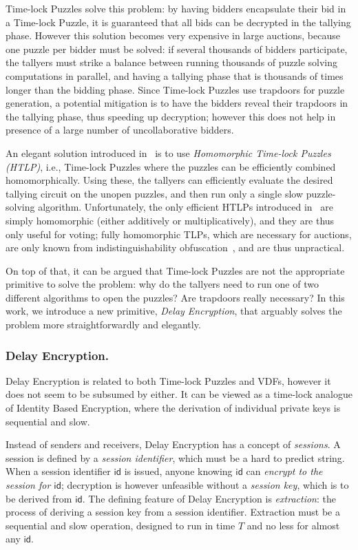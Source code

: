 \documentclass{llncs}
\newcommand{\id}{\mathsf{id}}
\begin{document}
Time-lock Puzzles solve this problem: by having bidders encapsulate
their bid in a Time-lock Puzzle, it is guaranteed that all bids can be
decrypted in the tallying phase. %
However this solution becomes very expensive in large auctions,
because one puzzle per bidder must be solved: if several thousands of
bidders participate, the tallyers must strike a balance between
running thousands of puzzle solving computations in parallel, and
having a tallying phase that is thousands of times longer than the
bidding phase. %
Since Time-lock Puzzles use trapdoors for puzzle generation, a
potential mitigation is to have the bidders reveal their trapdoors in
the tallying phase, thus speeding up decryption; however this does not
help in presence of a large number of uncollaborative bidders.

An elegant solution introduced in~\cite{C:MalThy19} is to use
\emph{Homomorphic Time-lock Puzzles (HTLP)}, i.e., Time-lock Puzzles
where the puzzles can be efficiently combined homomorphically. %
Using these, the tallyers can efficiently evaluate the desired
tallying circuit on the unopen puzzles, and then run only a single
slow puzzle-solving algorithm. %
Unfortunately, the only efficient HTLPs introduced
in~\cite{C:MalThy19} are simply homomorphic (either additively or
multiplicatively), and they are thus only useful for voting; fully
homomorphic TLPs, which are necessary for auctions, are only known
from indistinguishability obfuscation~\cite{FOCS:GGHRSW13}, and are
thus unpractical. %

On top of that, it can be argued that Time-lock Puzzles are not the
appropriate primitive to solve the problem: why do the tallyers need
to run one of two different algorithms to open the puzzles? Are
trapdoors really necessary? %
In this work, we introduce a new primitive, \emph{Delay Encryption},
that arguably solves the problem more straightforwardly and elegantly.


\subsubsection{Delay Encryption.}
Delay Encryption is related to both Time-lock Puzzles and VDFs,
however it does not seem to be subsumed by either. %
It can be viewed as a time-lock analogue of Identity Based Encryption,
where the derivation of individual private keys is sequential and
slow. %

Instead of senders and receivers, Delay Encryption has a concept of
\emph{sessions}. %
A session is defined by a \emph{session identifier}, which must be a
hard to predict string. %
When a session identifier $\id$ is issued, anyone knowing $\id$ can
\emph{encrypt to the session for $\id$}; decryption is however
unfeasible without a \emph{session key}, which is to be derived from
$\id$. %
The defining feature of Delay Encryption is \emph{extraction}: the
process of deriving a session key from a session identifier. %
Extraction must be a sequential and slow operation, designed to run in
time $T$ and no less for almost any $\id$.
\end{document}
